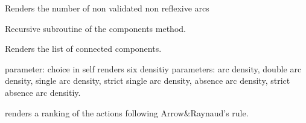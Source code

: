\documentclass[letterpaper,10pt,english]{sphinxmanual}
\begin{document}
\begin{fulllineitems}
\begin{fulllineitems}
\end{fulllineitems}


\begin{fulllineitems}
\label{techDoc:digraphs.Digraph.coSize}
Renders the number of non validated non reflexive arcs

\end{fulllineitems}


\begin{fulllineitems}
\label{techDoc:digraphs.Digraph.collectcomps}
Recursive subroutine of the components method.

\end{fulllineitems}


\begin{fulllineitems}
\label{techDoc:digraphs.Digraph.components}
Renders the list of connected components.

\end{fulllineitems}


\begin{fulllineitems}
\label{techDoc:digraphs.Digraph.computeAllDensities}
parameter: choice in self
renders six densitiy parameters:
arc density, double arc density,
single arc density, strict single arc density,
absence arc density, strict absence arc densitiy.

\end{fulllineitems}


\begin{fulllineitems}
\label{techDoc:digraphs.Digraph.computeArrowRaynaudRanking}
renders a ranking of the actions following Arrow\&Raynaud's rule.

\end{fulllineitems}


\end{fulllineitems}
\end{document}
